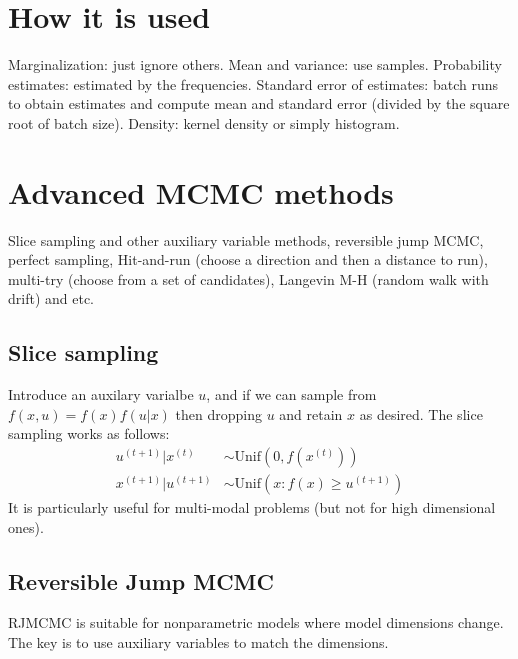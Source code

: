 \documentclass{article}
\newcommand{\dual}[2]{{#1}^{(#2)}} %
\begin{document}
\section{How it is used}
Marginalization: just ignore others. Mean and variance: use samples. Probability estimates: estimated by the frequencies. Standard error of estimates: batch runs to obtain estimates and compute mean and standard error (divided by the square root of batch size). Density: kernel density or simply histogram.

\section{Advanced MCMC methods}
Slice sampling and other auxiliary variable methods, reversible jump MCMC, perfect sampling, Hit-and-run (choose a direction and then a distance to run), multi-try (choose from a set of candidates), Langevin M-H (random walk with drift) and etc.

\subsection{Slice sampling}
Introduce an auxilary varialbe $u$, and if we can sample from $f(x,u) = f(x)f(u|x)$ then dropping $u$ and retain $x$ as desired. The slice sampling works as follows:
\begin{align}
\dual{u}{t+1} | \dual{x}{t} &\sim \text{Unif}\left(0, f\left(\dual{x}{t}\right)\right)\\
\dual{x}{t+1} | \dual{u}{t+1} &\sim \text{Unif}\left(x: f(x) \ge \dual{u}{t+1}\right)
\end{align}
It is particularly useful for multi-modal problems (but not for high dimensional ones).

\subsection{Reversible Jump MCMC}
RJMCMC is suitable for nonparametric models where model dimensions change. The key is to use auxiliary variables to match the dimensions.
\end{document}
